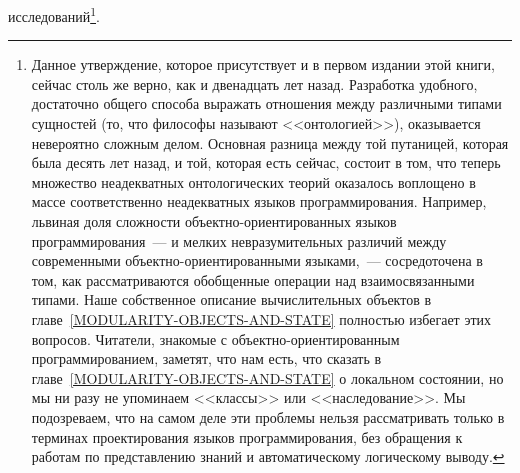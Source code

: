 исследований\footnote{Данное утверждение,
  которое присутствует и в первом 
издании этой книги, сейчас столь же верно, как и двенадцать лет
назад.  Разработка удобного, достаточно общего способа выражать
отношения между различными типами сущностей (то, что философы называют
<<онтологией>>), оказывается невероятно сложным делом.  Основная разница
между той путаницей, которая была десять лет назад, и той, которая
есть сейчас, состоит в том, что теперь множество неадекватных
онтологических теорий оказалось воплощено в массе соответственно
неадекватных языков программирования.  Например, львиная доля
сложности 
объектно-ориентированных языков
программирования~--- и
мелких невразумительных различий между современными объектно-ориентированными
языками,~--- сосредоточена в том, как рассматриваются обобщенные
операции над взаимосвязанными типами.  Наше собственное описание
вычислительных объектов в главе~\ref{MODULARITY-OBJECTS-AND-STATE}
полностью избегает этих вопросов.  Читатели, знакомые с
объектно-ориентированным программированием, заметят, что нам есть,
что сказать в главе~\ref{MODULARITY-OBJECTS-AND-STATE}
о локальном состоянии, но мы ни разу не упоминаем <<классы>> или
<<наследование>>.  Мы подозреваем, что на самом деле эти проблемы
нельзя рассматривать только в терминах проектирования языков
программирования, без обращения к работам по представлению знаний и
автоматическому логическому выводу.}.


